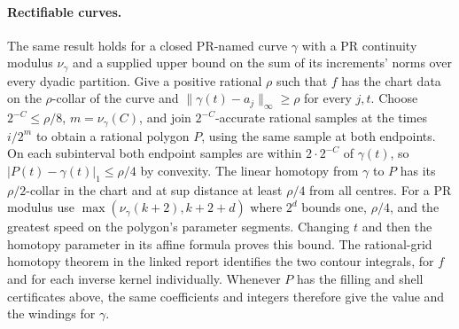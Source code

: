 \paragraph{Rectifiable curves.}
The same result holds for a closed PR-named curve $\gamma$ with
a PR continuity modulus $\nu_\gamma$ and a supplied upper bound on the
sum of its increments' norms over every dyadic partition. Give a
positive rational $\rho$ such that $f$ has the chart data on the
$\rho$-collar of the curve and
$\lVert\gamma(t)-a_j\rVert_\infty\ge\rho$ for every $j,t$.
Choose $2^{-C}\le\rho/8$, $m=\nu_\gamma(C)$, and join
$2^{-C}$-accurate rational samples at the times $i/2^m$ to obtain a
rational polygon $P$, using the same sample at both endpoints. On each
subinterval both endpoint samples are within $2\cdot2^{-C}$ of
$\gamma(t)$, so $|P(t)-\gamma(t)|_1\le\rho/4$ by convexity.
The linear homotopy from $\gamma$ to $P$ has its $\rho/2$-collar
in the chart and at sup distance at least $\rho/4$ from all centres.
For a PR modulus use $\max(\nu_\gamma(k+2),k+2+d)$ where $2^d$ bounds
one, $\rho/4$, and the greatest speed on the polygon's parameter
segments. Changing $t$ and then the homotopy parameter in its affine
formula proves this bound. The rational-grid homotopy theorem in the
linked report identifies the two contour integrals, for $f$ and for
each inverse kernel individually. Whenever $P$ has the filling and
shell certificates above, the same coefficients and integers therefore
give the value and the windings for $\gamma$.

